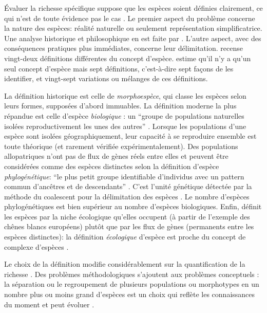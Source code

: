 \documentclass[
  11pt,
  french,
  a4paper,
  extrafontsizes,onecolumn,openright
  ]{memoir}
\begin{document}
Évaluer la richesse spécifique suppose que les espèces soient définies clairement, ce qui n'est de toute évidence pas le cas \autocite{Casetta2014}.
Le premier aspect du problème concerne la nature des espèces: réalité naturelle ou seulement représentation simplificatrice.
Une analyse historique et philosophique en est faite par \textcite{Richards2010}.
L'autre aspect, avec des conséquences pratiques plus immédiates, concerne leur délimitation.
\textcite{Mayden1997} recense vingt-deux définitions différentes du concept d'espèce.
\textcite{Wilkins2011} estime qu'il n'y a qu'un seul concept d'espèce mais sept définitions, c'est-à-dire sept façons de les identifier, et vingt-sept variations ou mélanges de ces définitions.

La définition historique est celle de \emph{morphoespèce}, qui classe les espèces selon leurs formes, supposées d'abord immuables.
La définition moderne la plus répandue est celle d'espèce \emph{biologique} \autocite{Dobzhansky1937}: un \enquote{groupe de populations naturelles isolées reproductivement les unes des autres} \autocite{Mayr1942}.
Lorsque les populations d'une espèce sont isolées géographiquement, leur capacité à se reproduire ensemble est toute théorique (et rarement vérifiée expérimentalement).
Des populations allopatriques n'ont pas de flux de gènes réels entre elles et peuvent être considérées comme des espèces distinctes selon la définition d'espèce \emph{phylogénétique}: \enquote{le plus petit groupe identifiable d'individus avec un pattern commun d'ancêtres et de descendants} \autocite{Cracraft1983}.
C'est l'unité génétique détectée par la méthode du coalescent pour la délimitation des espèces \autocite{Sukumaran2017}.
Le nombre d'espèces phylogénétiques est bien supérieur au nombre d'espèces biologiques.
Enfin, \textcite{VanValen1976} définit les espèces par la niche écologique qu'elles occupent (à partir de l'exemple des chênes blancs européens) plutôt que par les flux de gènes (permanents entre les espèces distinctes): la définition \emph{écologique} d'espèce est proche du concept de complexe d'espèces \autocite[ensemble d'espèces voisines échangeant des gènes,][]{Pernes1984}.

Le choix de la définition modifie considérablement sur la quantification de la richesse \autocite{Agapow2004}.
Des problèmes méthodologiques s'ajoutent aux problèmes conceptuels \autocite{Hey2001}: la séparation ou le regroupement de plusieurs populations ou morphotypes en un nombre plus ou moins grand d'espèces est un choix qui reflète les connaissances du moment et peut évoluer \autocite{Barberousse2014}.
\end{document}
